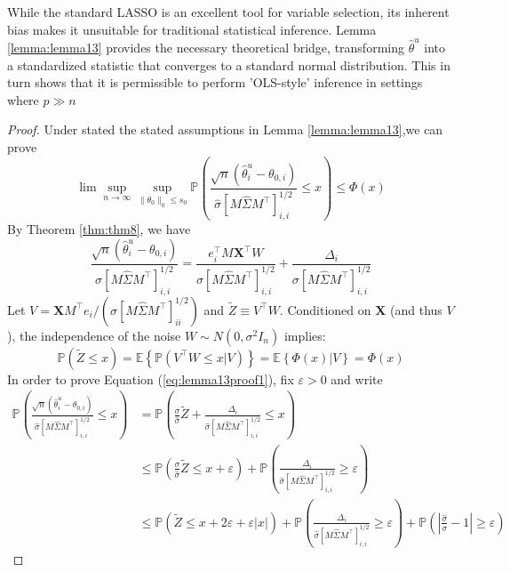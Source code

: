 \documentclass{article}
\begin{document}
While the standard LASSO is an excellent tool for variable selection, its inherent bias makes it unsuitable for traditional statistical inference. Lemma \ref{lemma:lemma13} provides the necessary theoretical bridge, transforming $\hat{\theta}^u$ into a standardized statistic that converges to a standard normal distribution. This in turn shows that it is permissible to perform 'OLS-style' inference in settings where $p \gg n$
\begin{proof}
    Under stated the stated assumptions in Lemma \ref{lemma:lemma13},we can prove 
    \begin{equation}
    \label{eq:lemma13proof1}
        \lim \sup_{n \to \infty}\sup_{\|\theta_0\|_0 \le s_0}\mathbb{P}\left(\frac{\sqrt{n}(\hat{\theta}^u_i - \theta_{0,i})}{\hat{\sigma} [M \hat{\Sigma}M^{\top}]_{i,i}^{1/2}}  \le x \right) \le \Phi(x)
    \end{equation}
    By Theorem \ref{thm:thm8}, we have
    $$
    \frac{\sqrt{n}(\hat{\theta}_i^u - \theta_{0, i})}{\sigma [M \hat{\Sigma} M^\top]^{1/2}_{i,i}} = \frac{e^{\top}_i M \mathbf{X}^\top W}{\sigma [M \hat{\Sigma} M^\top]^{1/2}_{i,i}} + \frac{\Delta_i}{\sigma [M \hat{\Sigma} M^\top]^{1/2}_{i,i}}
    $$
    Let $V = \mathbf{X}M^\top e_i / (\sigma [M \hat{\Sigma} M^\top]_{ii}^{1/2})$ and $\tilde{Z} \equiv V^\top W$. Conditioned on $\mathbf{X}$ (and thus $V$), the independence of the noise $W \sim N(0, \sigma^2 I_n)$ implies:
    $$
    \mathbb{P}( \tilde{Z} \le x) = \mathbb{E}\left\{\mathbb{P}(V^\top W\le x|V) \right\} = \mathbb{E}\left\{\Phi(x) | V \right\} = \Phi(x)
    $$
    In order to prove Equation (\ref{eq:lemma13proof1}), fix $\varepsilon >0$ and write
    $$
    \begin{aligned}
    \mathbb{P}\left(\frac{\sqrt{n}(\hat{\theta}^u_i - \theta_{0,i})}{\hat{\sigma} [M \hat{\Sigma}M^{\top}]_{i,i}^{1/2}}  \le x \right) &= \mathbb{P}\left(\frac{\sigma}{\hat{\sigma}}\tilde{Z} +  \frac{\Delta_i}{\hat{\sigma}[M \hat{\Sigma}M^\top]^{1/2}_{i,i}}  \le x \right)\\
    &\le \mathbb{P}\left(\frac{\sigma}{\hat{\sigma}}\tilde{Z} \le x + \varepsilon \right) + \mathbb{P}\left( \frac{\Delta_i}{\hat{\sigma}[M \hat{\Sigma}M^\top]^{1/2}_{i,i}}  \ge \varepsilon\right)\\
    &\le \mathbb{P}\left(\tilde{Z} \le x + 2\varepsilon + \varepsilon|x| \right) + \mathbb{P}\left( \frac{\Delta_i}{\hat{\sigma}[M \hat{\Sigma}M^\top]^{1/2}_{i,i}}  \ge \varepsilon\right) + \mathbb{P}\left(\left|\frac{\hat{\sigma}}{\sigma} - 1\right| \ge \varepsilon \right)
    \end{aligned}
$$
\end{proof}
\end{document}
